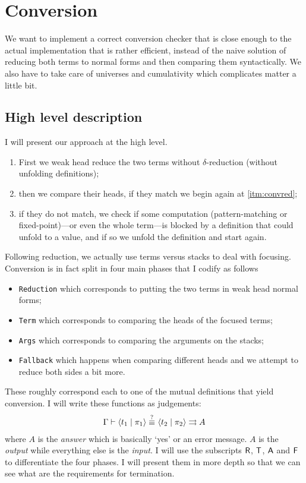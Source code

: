 \chapter{Conversion}

We want to implement a correct conversion checker that is close enough to the
actual implementation that is rather efficient, instead of the naive solution
of reducing both terms to normal forms and then comparing them syntactically.
We also have to take care of universes and cumulativity which complicates matter
a little bit.

\section{High level description}

I will present our approach at the high level.
\begin{enumerate}[label=(\arabic*)]
  \item \label{itm:convred} First we weak head reduce the two terms without
  \(\delta\)-reduction (\ie without unfolding definitions);
  \item then we compare their heads, if they match we begin again at
  \ref{itm:convred};
  \item if they do not match, we check if some computation (pattern-matching
  or fixed-point)---or even the whole term---is blocked by a definition that
  could unfold to a value, and if so we unfold the definition and start again.
\end{enumerate}

Following reduction, we actually use terms versus stacks to deal with focusing.
Conversion is in fact split in four main phases that I codify as follows
\begin{itemize}
  \item \texttt{Reduction} which corresponds to putting the two terms
  in weak head normal forms;
  \item \texttt{Term} which corresponds to comparing the heads of the
  focused terms;
  \item \texttt{Args} which corresponds to comparing the arguments
  on the stacks;
  \item \texttt{Fallback} which happens when comparing different heads
  and we attempt to reduce both sides a bit more.
\end{itemize}
These roughly correspond each to one of the mutual definitions that yield
conversion. I will write these functions as judgements:
\[
  \begin{array}{c}
    \Gamma \vdash \langle t_1 \mid \pi_1 \rangle \overset{?}{\equiv}_{} \langle t_2 \mid \pi_2 \rangle \rightrightarrows A
  \end{array}
\]
where \(A\) is the \emph{answer} which is basically `yes' or an error message.
\(A\) is the \emph{output} while everything else is the \emph{input}.
I will use the subscripts \(\mathsf{R}\), \(\mathsf{T}\), \(\mathsf{A}\) and \(\mathsf{F}\)
to differentiate the four phases.
I will present them in more depth so that we can see what are
the requirements for termination.

